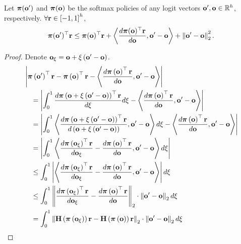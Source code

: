 \begin{lem}
\label{lem:logit_smoothness}
Let ${\boldsymbol{\pi}}({\mathbf{o}}^\prime)$ and ${\boldsymbol{\pi}}( {\mathbf{o}})$ be the softmax policies of any logit vectors ${\mathbf{o}}^\prime, {\mathbf{o}} \in {\mathbb{R}}^h$, respectively. $\forall {\mathbf{r}} \in \left[ -1, 1\right]^h$,
\begin{equation*}
    {\boldsymbol{\pi}}({\mathbf{o}}^\prime)^\top {\mathbf{r}} \le {\boldsymbol{\pi}}({\mathbf{o}})^\top {\mathbf{r}} + \left\langle \frac{d {\boldsymbol{\pi}}({\mathbf{o}})^\top {\mathbf{r}}}{d {\mathbf{o}}}, {\mathbf{o}}^\prime - {\mathbf{o}} \right\rangle + \left\| {\mathbf{o}}^\prime - {\mathbf{o}} \right\|_2^2.
\end{equation*}
\end{lem}
\begin{proof}
Denote ${\mathbf{o}}_{\xi} = {\mathbf{o}} + \xi \left( {\mathbf{o}}^\prime - {\mathbf{o}} \right)$.
\begin{equation*}
\begin{split}
    &\left| \rvpi\left( \rvo^\prime \right)^\top \rvr - \rvpi\left( \rvo \right)^\top \rvr - \left\langle \frac{d \rvpi\left( \rvo \right)^\top \rvr}{d \rvo}, \rvo^\prime - \rvo \right\rangle \right| \\
    &\quad = \left| \int_0^1{ \frac{d \rvpi\left( \rvo + \xi \left( \rvo^\prime - \rvo \right) \right)^\top \rvr}{d \xi} d\xi} - \left\langle \frac{d \rvpi\left( \rvo \right)^\top \rvr}{d \rvo}, \rvo^\prime - \rvo \right\rangle \right| \\
    &\quad = \left| \int_0^1{ \left\langle \frac{d \rvpi\left( \rvo + \xi \left( \rvo^\prime - \rvo \right) \right)^\top \rvr}{d \left( \rvo + \xi \left( \rvo^\prime - \rvo \right) \right)}, \rvo^\prime - \rvo \right\rangle d\xi} - \left\langle \frac{d \rvpi\left( \rvo \right)^\top \rvr}{d \rvo}, \rvo^\prime - \rvo \right\rangle \right| \\
    &\quad = \left| \int_0^1{ \left\langle \frac{d \rvpi\left( \rvo_{\xi} \right)^\top \rvr}{d \rvo_{\xi}} - \frac{d \rvpi\left( \rvo \right)^\top \rvr}{d \rvo}, \rvo^\prime - \rvo \right\rangle d\xi} \right| \\
    &\quad \le \int_0^1{ \left| \left\langle \frac{d \rvpi\left( \rvo_{\xi} \right)^\top \rvr}{d \rvo_{\xi}} - \frac{d \rvpi\left( \rvo \right)^\top \rvr}{d \rvo}, \rvo^\prime - \rvo \right\rangle \right| d\xi} \\
    &\quad \le \int_0^1{ \left\| \frac{d \rvpi\left( \rvo_{\xi} \right)^\top \rvr}{d \rvo_{\xi}} - \frac{d \rvpi\left( \rvo \right)^\top \rvr}{d \rvo} \right\|_2 \cdot \left\| \rvo^\prime - \rvo \right\|_2 d\xi} \\
    &\quad = \int_0^1{ \left\| \rmH\left( \rvpi\left( \rvo_{\xi} \right)\right) \rvr - \rmH\left( \rvpi\left( \rvo \right)\right) \rvr \right\|_2 \cdot \left\| \rvo^\prime - \rvo \right\|_2 d\xi} \\

\end{split}
\end{equation*}
\end{proof}
